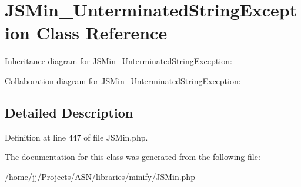 \hypertarget{class_j_s_min___unterminated_string_exception}{}\section{J\+S\+Min\+\_\+\+Unterminated\+String\+Exception Class Reference}
\label{class_j_s_min___unterminated_string_exception}


Inheritance diagram for J\+S\+Min\+\_\+\+Unterminated\+String\+Exception\+:


Collaboration diagram for J\+S\+Min\+\_\+\+Unterminated\+String\+Exception\+:


\subsection{Detailed Description}


Definition at line 447 of file J\+S\+Min.\+php.



The documentation for this class was generated from the following file\+:\begin{DoxyCompactItemize}
\item 
/home/jj/\+Projects/\+A\+S\+N/libraries/minify/\hyperlink{_j_s_min_8php}{J\+S\+Min.\+php}\end{DoxyCompactItemize}
